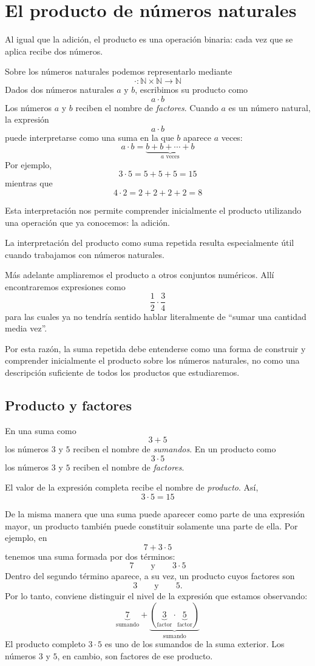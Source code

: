 \section{El producto de números naturales}

Al igual que la adición, el producto es una operación binaria: cada vez que se aplica recibe dos números.

Sobre los números naturales podemos representarlo mediante
\[
\cdot\colon\mathbb{N}\times\mathbb{N}\to\mathbb{N}
\]
Dados dos números naturales \(a\) y \(b\), escribimos su producto como
\[
a\cdot b
\]
Los números \(a\) y \(b\) reciben el nombre de \emph{factores}.
Cuando \(a\) es un número natural, la expresión
\[
a\cdot b
\]
puede interpretarse como una suma en la que \(b\) aparece \(a\) veces:
\[
a\cdot b
=
\underbrace{b+b+\cdots+b}_{a\text{ veces}}
\]
Por ejemplo,
\[
3\cdot5
=
5+5+5
=
15
\]
mientras que
\[
4\cdot2
=
2+2+2+2
=
8
\]

Esta interpretación nos permite comprender inicialmente el producto utilizando una operación que ya conocemos: la adición.

\begin{note}
La interpretación del producto como suma repetida resulta especialmente útil cuando trabajamos con números naturales.

Más adelante ampliaremos el producto a otros conjuntos numéricos. Allí encontraremos expresiones como
\[
\frac12\cdot\frac34
\]
para las cuales ya no tendría sentido hablar literalmente de ``sumar una cantidad media vez''.

Por esta razón, la suma repetida debe entenderse como una forma de construir y comprender inicialmente el producto sobre los números naturales, no como una descripción suficiente de todos los productos que estudiaremos.
\end{note}

\subsection{Producto y factores}

En una suma como
\[
3+5
\]
los números \(3\) y \(5\) reciben el nombre de \emph{sumandos}.
En un producto como
\[
3\cdot5
\]
los números \(3\) y \(5\) reciben el nombre de \emph{factores}.

El valor de la expresión completa recibe el nombre de \emph{producto}. Así,
\[
3\cdot5=15
\]

De la misma manera que una suma puede aparecer como parte de una expresión mayor, un producto también puede constituir solamente una parte de ella.
Por ejemplo, en
\[
7+3\cdot5
\]
tenemos una suma formada por dos términos:
\[
7
\qquad\text{y}\qquad
3\cdot5
\]
Dentro del segundo término aparece, a su vez, un producto cuyos factores son
\[
3
\qquad\text{y}\qquad
5.
\]
Por lo tanto, conviene distinguir el nivel de la expresión que estamos observando:
\[
\underbrace{7}_{\text{sumando}}
+
\underbrace{\left(
  \underbrace{3}_{\text{factor}}
  \cdot
  \underbrace{5}_{\text{factor}}
\right)}_{\text{sumando}}
\]
El producto completo \(3\cdot5\) es uno de los sumandos de la suma exterior. Los números \(3\) y \(5\), en cambio, son factores de ese producto.

